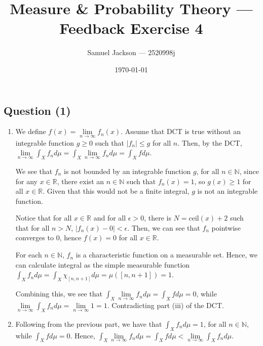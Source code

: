 \documentclass{article}
\title{Measure \& Probability Theory  --- Feedback Exercise 4}
\author{Samuel Jackson --- 2520998j}
\date{\today}
\begin{document}
\maketitle

\newcommand{\N}{\mathbb{N}}
\newcommand{\R}{\mathbb{R}}
\newcommand{\Z}{\mathbb{Z}}
\newcommand{\Q}{\mathbb{Q}}
\newcommand{\I}{\mathbb{I}}

\newcommand{\A}{\mathcal{A}}
\newcommand{\C}{\mathcal{C}}

\newcommand{\borel}{\mathcal{B}(\mathbb{R})}
\newcommand{\powerX}{\mathcal{P}(X)}

\newcommand{\salgebra}{\sigma\text{-algebra}}
\newcommand{\outerset}{\mathcal{M}_{\outermu}}
\newcommand{\outermu}{\mu^\ast}
\newcommand{\outerlamb}{\lambda^\ast}

\newcommand{\invf}{f^{-1}}
\newcommand{\invh}{h^{-1}}
\newcommand{\invg}{g^{-1}}

\newcommand{\nlim}{\lim\limits_{n \rightarrow \infty}}

\begin{center}
\section*{Question (1)}
\end{center}

\begin{enumerate}[label=(\roman*)]
    \item We define $f(x) = \nlim f_n(x)$. Assume that DCT is true without an integrable function $g \geq 0$ such that $|f_n| \leq g$ for all $n$. Then, by the DCT, $\nlim \int_X f_n d\mu= \int_X \nlim f_n d\mu = \int_X f d\mu$. \newline
    
    We see that $f_n$ is not bounded by an integrable function $g$, for all $n \in \N$, since for any $x \in \R$, there exist an $n \in \N$ such that $f_n(x) = 1$, so $g(x) \geq 1$ for all $x \in \R$. Given that this would not be a finite integral, $g$ is not an integrable function. 
    
    Notice that for all $x \in \R$ and for all $\epsilon > 0$, there is $N = \text{ceil}(x) + 2$ such that for all $n > N$, $|f_n(x) - 0| < \epsilon$. Then, we can see that $f_n$ pointwise converges to $0$, hence $f(x) = 0$ for all $x \in \R$. \newline
    
    For each $n \in \N$, $f_n$ is a characteristic function on a measurable set. Hence, we can calculate integral as the simple measurable function $\int_X f_n d\mu = \int_X  \chi_{[n, n+1]} d\mu = \mu([n, n+1]) = 1$. \newline
    
    Combining this, we see that $\int_X \nlim f_n d\mu = \int_X f d\mu = 0$, while $\nlim \int_X f_n d\mu = \nlim 1 = 1$. Contradicting part (iii) of the DCT.
    
    \item Following from the previous part, we have that $\int_X f_n d\mu = 1$, for all $n \in \N$, while $\int_X f d\mu = 0$. Hence, $\int_X \nlim f_n d\mu = \int_X f d\mu < \nlim \int_X f_n d\mu$.  
\end{enumerate}
    
\end{document}
